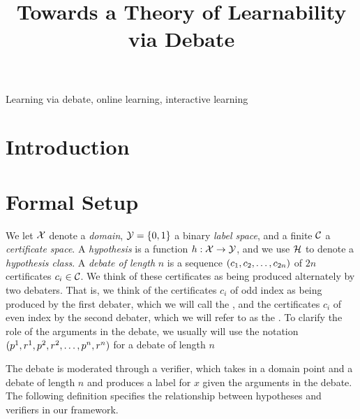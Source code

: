 \documentclass[anon]{alt2027} %
\title[Learnability via Debate]{Towards a Theory of Learnability via Debate}
\begin{document}
\maketitle

\begin{abstract}%
\end{abstract}

\begin{keywords}%
  Learning via debate, online learning, interactive learning
\end{keywords}

\section{Introduction}



% 

\section{Formal Setup}\label{sec:formal}
We let ${\mathcal X}$ denote a \emph{domain}, ${\mathcal Y} = \{0,1\}$ a binary \emph{label space}, and a finite ${{\mathcal C}}$ a \emph{certificate space}.  
A \emph{hypothesis} is a function $h:{\mathcal X}\to{\mathcal Y}$, and we use ${{\mathcal H}}$ to denote a \emph{hypothesis class}.
A \emph{debate of length} $n$ is a sequence $(c_1, c_2, \ldots, c_{2n})$ of $2n$ certificates $c_i\in{{\mathcal C}}$. We think of these certificates as being produced alternately by two debaters. That is, we think of the certificates $c_i$ of odd index as being produced by the first debater, which we will call the \dt, and the certificates $c_i$ of even index by the second debater, which we will refer to as the \df. To clarify the role of the arguments in the debate, we usually will use the notation $({p}^1, {r}^1, {p}^2, {r}^2, \ldots,  {p}^n, {r}^n)$ for a debate of length $n$

The debate is moderated through a verifier, which takes in a domain point and a debate of length $n$ and produces a label for $x$ given the arguments in the debate. 
The following definition specifies the relationship between hypotheses and verifiers in our framework.
\end{document}
